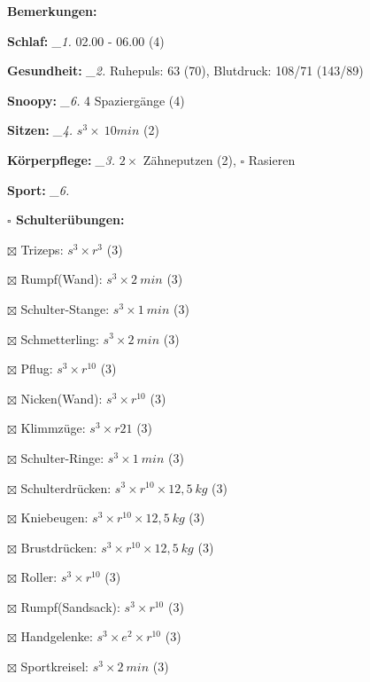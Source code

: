 \documentclass[10pt,a4paper]{article}
\newcommand\prop[1] {{\color {alizarin} {\bf #1}}}             %
\newcommand\mand[1] {{\color {burntorange} {\bf #1}}}          %
\newcommand\topspace{\vskip -15pt \hskip 20pt}
\newcommand\n[1] { {\sl #1.} \hskip 5pt }
\begin{document}
\begin{mdframed}[style=daystyle]
  \begin{labeling}{{\mand {Bemerkungen:}}}
    \setlength\itemsep{-3pt}
  \item[{\mand {Schlaf:}}]        \n{\_1} 02.00 - 06.00 (4)
  \item[{\mand {Gesundheit:}}]    \n{\_2} Ruhepuls: 63 (70), Blutdruck: 108/71 (143/89)
  \item[{\mand {Snoopy:}}]        \n{\_6} 4 Spaziergänge (4)
  \item[{\mand {Sitzen:}}]        \n{\_4} $s^3 \times\ 10 min$ (2)
  \item[{\mand {Körperpflege:}}]  \n{\_3} $2 \times$ Zähneputzen (2), $\square$ Rasieren
  \item[{\mand {Sport:}}]         \n{\_6}
    \topspace
    \begin{minipage}{0.75\textwidth}  
      \begin{labeling}{\prop {$\square$ {Schulterübungen:}}} 
        \setlength\itemsep{-3pt}
      \item[$\boxtimes$ Trizeps:]         $s^3 \times r^{3}$ (3)
      \item[$\boxtimes$ Rumpf(Wand):]     $s^3 \times 2\ min$ (3)
      \item[$\boxtimes$ Schulter-Stange:] $s^3 \times 1\ min$ (3)
      \item[$\boxtimes$ Schmetterling:]   $s^3 \times 2\ min$ (3)
      \item[$\boxtimes$ Pflug:]           $s^3 \times r^{10}$ (3)
      \item[$\boxtimes$ Nicken(Wand):]    $s^3 \times r^{10}$ (3)
      \item[$\boxtimes$ Klimmzüge:]       $s^3 \times r21$ (3)
      \item[$\boxtimes$ Schulter-Ringe:]  $s^3 \times 1\ min$ (3)
      \item[$\boxtimes$ Schulterdrücken:] $s^3 \times r^{10} \times 12,5\ kg$ (3)
      \item[$\boxtimes$ Kniebeugen:]      $s^3 \times r^{10} \times 12,5\ kg$ (3)
      \item[$\boxtimes$ Brustdrücken:]    $s^3 \times r^{10} \times 12,5\ kg$ (3)
      \item[$\boxtimes$ Roller:]          $s^3 \times r^{10}$ (3)
      \item[$\boxtimes$ Rumpf(Sandsack):] $s^3 \times r^{10}$ (3)
      \item[$\boxtimes$ Handgelenke:]     $s^3 \times e^2 \times r^{10}$ (3)
      \item[$\boxtimes$ Sportkreisel:]    $s^3 \times 2\ min$ (3)

\end{labeling}
\end{minipage}
\end{labeling}
\end{mdframed}
\end{document}
